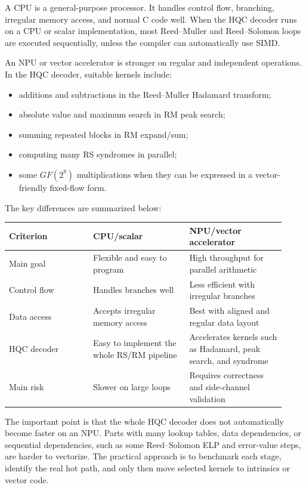 \documentclass[12pt,a4paper]{article}
\begin{document}
A CPU is a general-purpose processor. It handles control flow, branching, irregular memory access, and normal C code well. When the HQC decoder runs on a CPU or scalar implementation, most Reed--Muller and Reed--Solomon loops are executed sequentially, unless the compiler can automatically use SIMD.

An NPU or vector accelerator is stronger on regular and independent operations. In the HQC decoder, suitable kernels include:

\begin{itemize}
    \item additions and subtractions in the Reed--Muller Hadamard transform;
    \item absolute value and maximum search in RM peak search;
    \item summing repeated blocks in RM expand/sum;
    \item computing many RS syndromes in parallel;
    \item some $GF(2^8)$ multiplications when they can be expressed in a vector-friendly fixed-flow form.
\end{itemize}

The key differences are summarized below:

\begin{center}
\begin{tabular}{p{0.28\linewidth}p{0.32\linewidth}p{0.32\linewidth}}
\toprule
Criterion & CPU/scalar & NPU/vector accelerator \\
\midrule
Main goal & Flexible and easy to program & High throughput for parallel arithmetic \\
Control flow & Handles branches well & Less efficient with irregular branches \\
Data access & Accepts irregular memory access & Best with aligned and regular data layout \\
HQC decoder & Easy to implement the whole RS/RM pipeline & Accelerates kernels such as Hadamard, peak search, and syndrome \\
Main risk & Slower on large loops & Requires correctness and side-channel validation \\
\bottomrule
\end{tabular}
\end{center}

The important point is that the whole HQC decoder does not automatically become faster on an NPU. Parts with many lookup tables, data dependencies, or sequential dependencies, such as some Reed--Solomon ELP and error-value steps, are harder to vectorize. The practical approach is to benchmark each stage, identify the real hot path, and only then move selected kernels to intrinsics or vector code.
\end{document}
